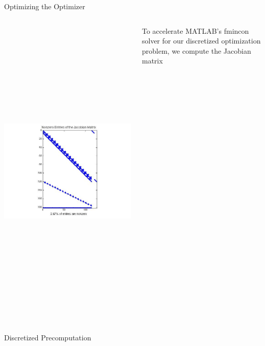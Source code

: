 \documentclass[final]{beamer}
\begin{document}
\begin{frame}{}
{\begin{columns}[t]
\begin{column}{.30\linewidth}
\begin{block}{\centering Optimizing the Optimizer}
\begin{columns}[T]
\begin{column}{16cm}{}
\centering\includegraphics[height=15cm, width=20cm]{figures/Spy_Jacobian.jpg} \\

\end{column}

\begin{column}{16cm}{}

To accelerate MATLAB's fmincon solver for our discretized optimization problem, we compute the
Jacobian matrix

\end{column}
\end{columns}


\end{block}

\begin{block}{\centering Discretized Precomputation}


\end{block}
\end{column}
\end{columns}}
\end{frame}
\end{document}
